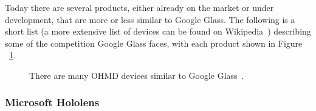 Today there are several products, either already on the market or under development, that are more or less similar to Google Glass. The following is a short list (a more extensive list of devices can be found on Wikipedia~\cite{ohmdWiki}) describing some of the competition Google Glass faces, with each product shown in Figure ~\ref{imagesSimilarProducts}. 

	\begin{figure}[H]%
		\centering
    \qquad
    \qquad
    \qquad
    \qquad
		\caption{There are many OHMD devices similar to Google Glass~\cite{ohmdWiki}.}
		\label{imagesSimilarProducts}
	\end{figure}
	

\subsubsection{Microsoft Hololens}

